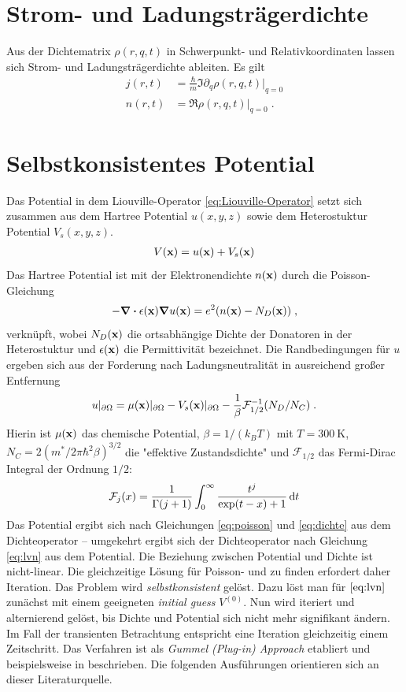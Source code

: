 \section{Strom- und Ladungsträgerdichte}
Aus der Dichtematrix $\rho(r,q,t)$ in Schwerpunkt- und Relativkoordinaten lassen sich Strom- und Ladungsträgerdichte ableiten. Es gilt
\begin{align}
  j(r,t) &= \frac{\hbar}{m}\Im{\partial_q \rho(r,q,t)|_{q=0}} \\
  n(r,t) &= \Re{\rho(r,q,t)|_{q=0}} \; .
  \label{eq:dichte}
\end{align}

\section{Selbstkonsistentes Potential}
Das Potential in dem Liouville-Operator \eqref{eq:Liouville-Operator} setzt sich zusammen aus dem Hartree Potential $u(x,y,z)$ sowie dem Heterostuktur Potential $V_s(x,y,z)$.
\begin{align}
  V(\vb{x}) = u(\vb{x}) + V_s(\vb{x})
\end{align}
Das Hartree Potential ist mit der Elektronendichte $n(\vb{x})$ durch die Poisson-Gleichung \cite{frensley}
\begin{align}
  -\div \epsilon(\vb{x}) \grad u(\vb{x}) = e^2 (n(\vb{x}) - N_D(\vb{x})) \; ,
  \label{eq:poisson}
\end{align}
verknüpft, wobei $N_D(\vb{x})$ die ortsabhängige Dichte der Donatoren in der Heterostuktur und $\epsilon(\vb{x})$ die Permittivität bezeichnet.
Die Randbedingungen für $u$ ergeben sich aus der Forderung nach Ladungsneutralität in ausreichend großer Entfernung  \cite{frensley}
\begin{align}
  u|_{\partial\Omega} = \mu(\vb{x})|_{\partial\Omega}-V_s(\vb{x})|_{\partial\Omega}-\frac{1}{\beta}\mathcal{F}_{1/2}^{-1}(N_D/N_C) \; .
  \label{eq:RB_PE}
\end{align}
Hierin ist $\mu(\vb{x})$ das chemische Potential, $\beta=1/(k_BT)$ mit $T=\SI{300}{\kelvin}$, $N_C = 2(m^*/2\pi\hbar^2\beta)^{3/2}$ die "effektive Zustandsdichte" und $\mathcal{F}_{1/2}$ das Fermi-Dirac Integral der Ordnung $1/2$:
\begin{align}
  \mathcal{F}_j(x)=\frac{1}{\Gamma(j+1)}\int_0^{\infty}\frac{t^j}{\exp(t-x)+1}\mathop{}\!\mathrm{d} t
\end{align}
Das Potential ergibt sich nach Gleichungen \eqref{eq:poisson} und \eqref{eq:dichte} aus dem Dichteoperator -- umgekehrt ergibt sich der Dichteoperator nach Gleichung \eqref{eq:lvn} aus dem Potential. Die Beziehung zwischen Potential und Dichte ist nicht-linear. Die gleichzeitige Lösung für Poisson- und \lvn zu finden erfordert daher Iteration. Das Problem wird \emph{selbstkonsistent} gelöst. Dazu löst man für $\eqref{eq:lvn}$ zunächst mit einem geeigneten \emph{initial guess} $V^{(0)}$. Nun wird iteriert und alternierend gelöst, bis Dichte und Potential sich nicht mehr signifikant ändern. Im Fall der transienten Betrachtung entspricht eine Iteration gleichzeitig einem Zeitschritt. Das Verfahren ist als \emph{Gummel (Plug-in) Approach} etabliert und beispielsweise in \cite{gummel} beschrieben. Die folgenden Ausführungen orientieren sich an dieser Literaturquelle.

